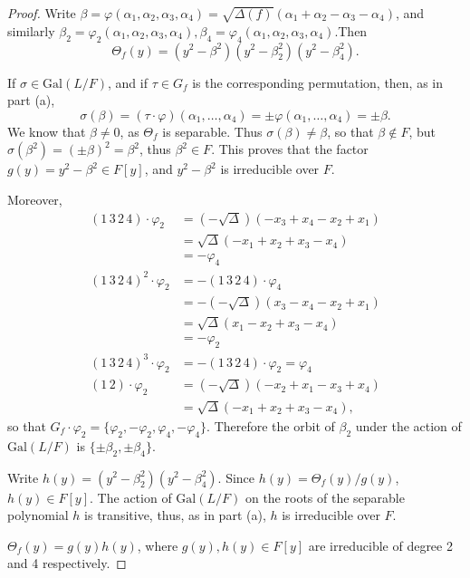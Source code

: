\documentclass[11pt,a4paper]{article}
\newcommand{\Gal}{\mathrm{Gal}}
\begin{document}
{\begin{proof}
Write $\beta = \varphi(\alpha_1,\alpha_2,\alpha_3,\alpha_4) = \sqrt{\Delta(f)}(\alpha_1+\alpha_2-\alpha_3-\alpha_4)$, and similarly $\beta_2 = \varphi_2(\alpha_1,\alpha_2,\alpha_3,\alpha_4),\beta_4 = \varphi_4(\alpha_1,\alpha_2,\alpha_3,\alpha_4)$.Then
$$\Theta_f(y) = (y^2 - \beta^2)(y^2-\beta_2^2)(y^2 - \beta_4^2).$$

If $\sigma \in \Gal(L/F)$, and if $\tau \in G_f$ is the corresponding permutation, then, as in part (a),
$$\sigma(\beta) = (\tau \cdot \varphi)(\alpha_1,\ldots,\alpha_4) = \pm \varphi(\alpha_1,\ldots,\alpha_4) = \pm \beta.$$
We know that $\beta \ne 0$, as $\Theta_f$ is separable. Thus $\sigma(\beta) \ne \beta$, so that $\beta \not \in F$, but $\sigma(\beta^2) = (\pm \beta)^2 = \beta^2$, thus $\beta^2 \in F$.
This proves that the factor $g(y) = y^2 - \beta^2 \in F[y]$, and $y^2 - \beta^2$ is irreducible over $F$.

Moreover,
\begin{align*}
(1\,3\,2\,4)\cdot \varphi_2 &= (-\sqrt{\Delta})(-x_3+x_4-x_2+x_1)\\
&=\sqrt{\Delta}(-x_1+x_2+x_3-x_4)\\
&=-\varphi_4\\
(1\,3\,2\,4)^2 \cdot \varphi_2&= -(1\,3\,2\,4)\cdot \varphi_4\\
&=-(-\sqrt{\Delta})(x_3-x_4-x_2+x_1)\\
&=\sqrt{\Delta}(x_1 - x_2+x_3-x_4)\\
&=-\varphi_2\\
(1\,3\,2\,4)^3 \cdot \varphi_2 &= -(1\,3\,2\,4)\cdot \varphi_2 = \varphi_4\\
(1\,2)\cdot \varphi_2 &= (-\sqrt{\Delta})(-x_2+x_1-x_3+x_4)\\
&=\sqrt{\Delta}(-x_1+x_2+x_3-x_4),
\end{align*}
so that $G_f\cdot \varphi_2 = \{\varphi_2,-\varphi_2,\varphi_4, -\varphi_4\}$. Therefore the orbit of $\beta_2$ under the action of $\Gal(L/F)$ is $\{\pm \beta_2, \pm \beta_4\}$.

Write $h(y) = (y^2-\beta_2^2)(y^2 - \beta_4^2)$. Since $h(y) = \Theta_f(y)/g(y)$, $h(y) \in F[y]$. The action of $\Gal(L/F)$ on the roots of the separable polynomial $h$ is transitive, thus, as in part (a), $h$ is irreducible over $F$.

$\Theta_f(y)=g(y)h(y)$, where $g(y),h(y)\in F[y]$ are irreducible of degree 2 and 4 respectively.


\end{proof}}
\end{document}
